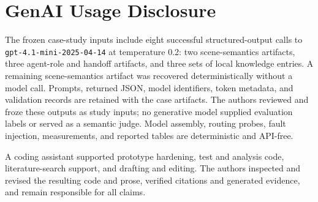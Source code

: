 \section*{GenAI Usage Disclosure}

The frozen case-study inputs include eight successful structured-output calls
to \texttt{gpt-4.1-mini-2025-04-14} at temperature 0.2: two scene-semantics
artifacts, three agent-role and handoff artifacts, and three sets of local
knowledge entries.  A remaining scene-semantics artifact was recovered
deterministically without a model call.  Prompts, returned JSON, model
identifiers, token metadata, and validation records are retained with the case
artifacts.  The authors reviewed and froze these outputs as study inputs; no
generative model supplied evaluation labels or served as a semantic judge.
Model assembly, routing probes, fault injection, measurements, and reported
tables are deterministic and API-free.

A coding assistant supported prototype hardening, test and analysis code,
literature-search support, and drafting and editing.  The authors inspected and
revised the resulting code and prose, verified citations and generated
evidence, and remain responsible for all claims.
